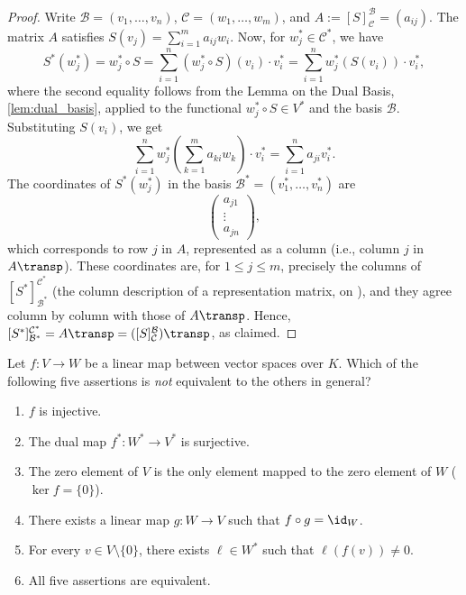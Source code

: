 \begin{proof}
  Write $\mathcal{B} = (v_1, \dots, v_n)$, $\mathcal{C} = (w_1, \dots, w_m)$, and $A := [S]_{\mathcal{C}}^{\mathcal{B}} = (a_{ij})$. The matrix $A$ satisfies $S(v_j) = \sum_{i=1}^m a_{ij} w_i$. Now, for $w_j^* \in \mathcal{C}^*$, we have
  \[ S^*(w_j^*) = w_j^* \circ S = \sum_{i=1}^n (w_j^* \circ S)(v_i) \cdot v_i^* = \sum_{i=1}^n w_j^*(S(v_i)) \cdot v_i^*, \]
  where the second equality follows from the Lemma on the Dual Basis, \cref{lem:dual_basis}, applied to the functional $w_j^* \circ S \in V^*$ and the basis $\mathcal{B}$. Substituting $S(v_i)$, we get
  \[ \sum_{i=1}^n w_j^*\left(\sum_{k=1}^m a_{ki} w_k\right) \cdot v_i^* = \sum_{i=1}^n a_{ji} v_i^*. \]
  The coordinates of $S^*(w_j^*)$ in the basis $\mathcal{B}^* = (v_1^*, \dots, v_n^*)$ are
  \[
  \begin{pmatrix} a_{j1} \\ \vdots \\ a_{jn} \end{pmatrix},
  \]
  which corresponds to row $j$ in $A$, represented as a column (i.e., column $j$ in $A\transp$).
  These coordinates are, for $1 \le j \le m$, precisely the columns of $[S^*]_{\mathcal{B}^*}^{\mathcal{C}^*}$ (the column description of a representation matrix, on ), and they agree column by column with those of $A\transp$. Hence, $[S^*]_{\mathcal{B}^*}^{\mathcal{C}^*} = A\transp = ([S]_{\mathcal{C}}^{\mathcal{B}})\transp$, as claimed.
\end{proof}

\begin{exercise}
\label{exc:dual_map_equivalences_sc}
Let $f \colon V \to W$ be a linear map between vector spaces over $K$. Which of the following five assertions is \emph{not} equivalent to the others in general?
\begin{enumerate}[label=\textbf{(\alph*)}]
    \item $f$ is injective.
    \item The dual map $f^* \colon W^* \to V^*$ is surjective.
    \item The zero element of $V$ is the only element mapped to the zero element of $W$ ($\ker f = \{0\}$).
    \item There exists a linear map $g \colon W \to V$ such that $f \circ g = \id_W$.
    \item For every $v \in V \setminus \{0\}$, there exists $\ell \in W^*$ such that $\ell(f(v)) \ne 0$.
    \item All five assertions are equivalent.
\end{enumerate}
\end{exercise}

